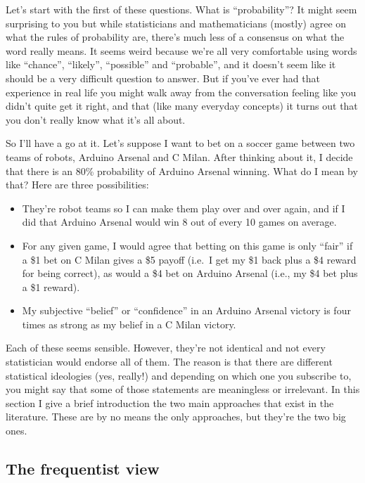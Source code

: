 \documentclass[
  a4paper,
]{book}
\providecommand{\tightlist}{%
  \setlength{\itemsep}{0pt}\setlength{\parskip}{0pt}}\usepackage{longtable,booktabs,array}
\begin{document}
Let's start with the first of these questions. What is ``probability''?
It might seem surprising to you but while statisticians and
mathematicians (mostly) agree on what the rules of probability are,
there's much less of a consensus on what the word really means. It seems
weird because we're all very comfortable using words like ``chance'',
``likely'', ``possible'' and ``probable'', and it doesn't seem like it
should be a very difficult question to answer. But if you've ever had
that experience in real life you might walk away from the conversation
feeling like you didn't quite get it right, and that (like many everyday
concepts) it turns out that you don't really know what it's all about.

So I'll have a go at it. Let's suppose I want to bet on a soccer game
between two teams of robots, Arduino Arsenal and C Milan. After thinking
about it, I decide that there is an 80\% probability of Arduino Arsenal
winning. What do I mean by that? Here are three possibilities:

\begin{itemize}
\tightlist
\item
  They're robot teams so I can make them play over and over again, and
  if I did that Arduino Arsenal would win 8 out of every 10 games on
  average.
\item
  For any given game, I would agree that betting on this game is only
  ``fair'' if a \$1 bet on C Milan gives a \$5 payoff (i.e.~I get my \$1
  back plus a \$4 reward for being correct), as would a \$4 bet on
  Arduino Arsenal (i.e., my \$4 bet plus a \$1 reward).
\item
  My subjective ``belief'' or ``confidence'' in an Arduino Arsenal
  victory is four times as strong as my belief in a C Milan victory.
\end{itemize}

Each of these seems sensible. However, they're not identical and not
every statistician would endorse all of them. The reason is that there
are different statistical ideologies (yes, really!) and depending on
which one you subscribe to, you might say that some of those statements
are meaningless or irrelevant. In this section I give a brief
introduction the two main approaches that exist in the literature. These
are by no means the only approaches, but they're the two big ones.

\hypertarget{the-frequentist-view}{%
\subsection{The frequentist view}\label{the-frequentist-view}}
\end{document}
